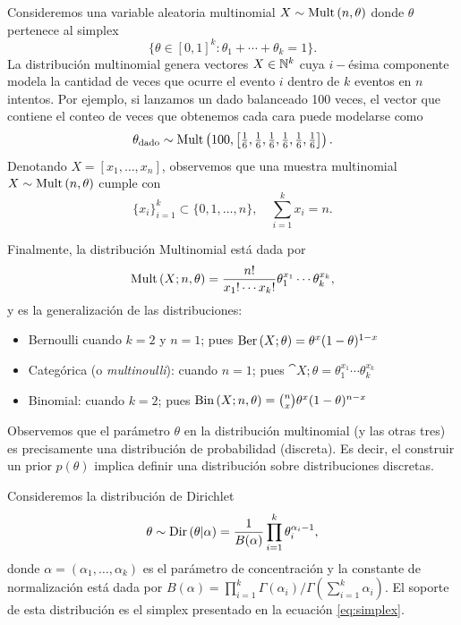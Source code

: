 \begin{example}
Consideremos una variable aleatoria multinomial $X\sim\text{Mult}\left(n,\theta\right)$ donde $\theta$ pertenece al simplex 
\begin{equation}
	\label{eq:simplex}
  \{\theta\in[0,1]^k:\theta_1 + \cdots + \theta_k = 1 \}.
 \end{equation} 
 La distribución multinomial genera vectores $X\in{\mathbb N}^k$ cuya $i-$ésima componente modela la cantidad de veces que ocurre el evento $i$ dentro de $k$ eventos en $n$ intentos. Por ejemplo, si lanzamos un dado balanceado 100 veces, el vector que contiene el conteo de veces que obtenemos cada cara puede modelarse como 
 \begin{equation}
  	\theta_\text{dado} \sim \text{Mult}\left(100,\left[\tfrac{1}{6},\tfrac{1}{6},\tfrac{1}{6},\tfrac{1}{6},\tfrac{1}{6},\tfrac{1}{6}\right]\right).
  \end{equation} 
Denotando $X=[x_1,\ldots,x_n]$, observemos que una muestra multinomial $X\sim\text{Mult}\left(n,\theta\right)$ cumple con 
\begin{equation}
	\{x_i\}_{i=1}^k \subset \{0,1,\ldots,n\},\quad  \sum_{i=1}^kx_i = n.
\end{equation}

Finalmente, la distribución Multinomial está dada por 
\begin{equation}
 	\text{Mult}\left(X;n,\theta\right) = \frac{n!}{x_1!\cdots x_k!} \theta_1^{x_1}\cdots\theta_k^{x_k},
 \end{equation} 
 y es la generalización de las distribuciones: 
\begin{itemize}
	\item Bernoulli cuando $k=2$ y $n=1$; pues $\text{Ber}\left(X;\theta\right) = \theta^{x} (1-\theta)^{1-x}$
	\item Categórica (o \emph{multinoulli}): cuando $n=1$; pues $\cat{X;\theta} = \theta_1^{x_1}\cdots\theta_k^{x_k}$
	\item Binomial: cuando $k=2$; pues $\text{Bin}\left(X;n,\theta\right) = \binom{n}{x} \theta^{x}(1-\theta)^{n-x}$
\end{itemize}
\end{example}

Observemos que el parámetro $\theta$ en la distribución multinomial (y las otras tres) es precisamente una distribución de probabilidad (discreta). Es decir, el construir un prior $p(\theta)$ implica definir una distribución sobre distribuciones discretas.  


\begin{definition}
Consideremos la  distribución de Dirichlet
\begin{equation}
	\theta \sim \text{Dir}\left(\theta|\alpha\right) = \frac{1}{B(\alpha)} \prod_{i=1}^k \theta_i^{\alpha_i-1},
\end{equation}
donde $\alpha = (\alpha_1,\ldots,\alpha_k)$ es el parámetro de concentración y la constante de normalización está dada por $B(\alpha)=\prod_{i=1}^k\Gamma(\alpha_i)/\Gamma(\sum_{i=1}^k\alpha_i)$. El soporte de esta distribución es el simplex presentado en la ecuación \eqref{eq:simplex}.
\end{definition}



